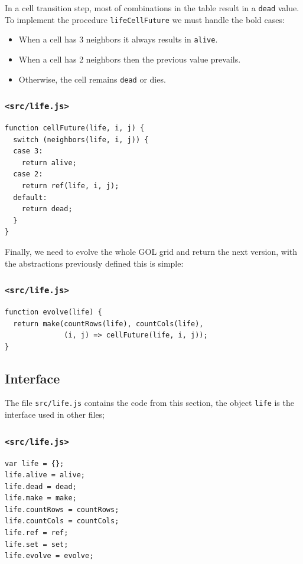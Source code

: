\documentclass[11pt]{article}
\begin{document}
In a cell transition step, most of combinations in the table result in a \texttt{dead} value. To implement the procedure \texttt{lifeCellFuture} we must handle the bold cases:
\begin{itemize}
\item When a cell has 3 neighbors it always results in \texttt{alive}.
\item When a cell has 2 neighbors then the previous value prevails.
\item Otherwise, the cell remains \texttt{dead} or dies.
\end{itemize}
\subsubsection*{\texttt{<src/life.js>}}
\label{sec:org290f72a}
\begin{verbatim}
function cellFuture(life, i, j) {
  switch (neighbors(life, i, j)) {
  case 3:
    return alive;
  case 2:
    return ref(life, i, j);
  default:
    return dead;
  }
}
\end{verbatim}

Finally, we need to evolve the whole GOL grid and return the next version, with the abstractions previously defined this is simple:

\subsubsection*{\texttt{<src/life.js>}}
\label{sec:org0371ebd}
\begin{verbatim}
function evolve(life) {
  return make(countRows(life), countCols(life),
              (i, j) => cellFuture(life, i, j));
}
\end{verbatim}

\subsection{Interface}
\label{sec:org72ec596}

The file \texttt{src/life.js} contains the code from this section, the object \texttt{life} is the interface used in other files;

\subsubsection*{\texttt{<src/life.js>}}
\label{sec:org1949a7d}
\begin{verbatim}
var life = {};
life.alive = alive;
life.dead = dead;
life.make = make;
life.countRows = countRows;
life.countCols = countCols;
life.ref = ref;
life.set = set;
life.evolve = evolve;
\end{verbatim}
\end{document}

